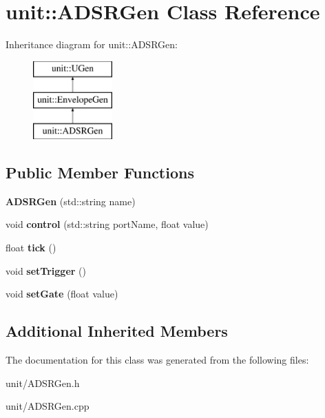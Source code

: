\hypertarget{classunit_1_1ADSRGen}{}\section{unit\+:\+:A\+D\+S\+R\+Gen Class Reference}
\label{classunit_1_1ADSRGen}
Inheritance diagram for unit\+:\+:A\+D\+S\+R\+Gen\+:\begin{figure}[H]
\begin{center}
\leavevmode
\includegraphics[height=3.000000cm]{classunit_1_1ADSRGen}
\end{center}
\end{figure}
\subsection*{Public Member Functions}
\begin{DoxyCompactItemize}
\item 
{\bfseries A\+D\+S\+R\+Gen} (std\+::string name)\hypertarget{classunit_1_1ADSRGen_a7e2d63eecbe51fc86a93697dd4d47964}{}\label{classunit_1_1ADSRGen_a7e2d63eecbe51fc86a93697dd4d47964}

\item 
void {\bfseries control} (std\+::string port\+Name, float value)\hypertarget{classunit_1_1ADSRGen_ac43bddd25b9a84f0ad6b299ed55f5133}{}\label{classunit_1_1ADSRGen_ac43bddd25b9a84f0ad6b299ed55f5133}

\item 
float {\bfseries tick} ()\hypertarget{classunit_1_1ADSRGen_a91a149fa5065d94dccec224b18710a24}{}\label{classunit_1_1ADSRGen_a91a149fa5065d94dccec224b18710a24}

\item 
void {\bfseries set\+Trigger} ()\hypertarget{classunit_1_1ADSRGen_a8685be5cffea6ec29dc1ebdc44402f70}{}\label{classunit_1_1ADSRGen_a8685be5cffea6ec29dc1ebdc44402f70}

\item 
void {\bfseries set\+Gate} (float value)\hypertarget{classunit_1_1ADSRGen_aee81e429433522eeb6362338fe15d551}{}\label{classunit_1_1ADSRGen_aee81e429433522eeb6362338fe15d551}

\end{DoxyCompactItemize}
\subsection*{Additional Inherited Members}


The documentation for this class was generated from the following files\+:\begin{DoxyCompactItemize}
\item 
unit/A\+D\+S\+R\+Gen.\+h\item 
unit/A\+D\+S\+R\+Gen.\+cpp\end{DoxyCompactItemize}
